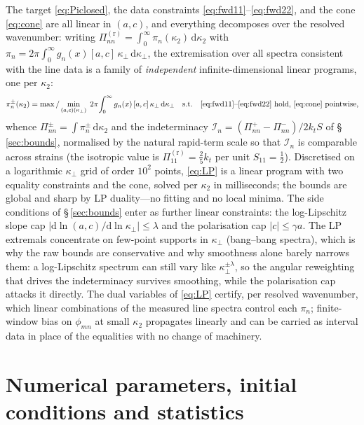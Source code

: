 \documentclass[lineno]{JFM-FLM_Au}
\begin{document}
The target \eqref{eq:Piclosed}, the data constraints
\eqref{eq:fwd11}--\eqref{eq:fwd22}, and the cone \eqref{eq:cone} are all
linear in $(a,c)$, and everything decomposes over the resolved wavenumber:
writing $\Pi^{(\mathrm r)}_{nn}=\int_0^\infty
\pi_n(\kappa_2)\,\mathrm{d}\kappa_2$ with
$\pi_n=2\pi\int_0^\infty g_n(x)[a,c]\,\kappa_\perp\,\mathrm{d}\kappa_\perp$,
the extremisation over all spectra consistent with the line data is a
family of \emph{independent} infinite-dimensional linear programs, one per
$\kappa_2$:
\begin{equation}
  \pi_n^{\pm}(\kappa_2)
  = \max/\min_{(a,c)(\kappa_\perp)}\;
    2\pi\!\int_0^\infty g_n(x)\,[a,c]\,\kappa_\perp\,\mathrm{d}\kappa_\perp
  \quad\text{s.t.}\quad
  \text{\eqref{eq:fwd11}--\eqref{eq:fwd22} hold, \eqref{eq:cone}
  pointwise},
  \label{eq:LP}
\end{equation}
whence $\Pi^{\pm}_{nn}=\int\pi_n^{\pm}\,\mathrm{d}\kappa_2$ and the
indeterminacy $\mathcal I_n=(\Pi^{+}_{nn}-\Pi^{-}_{nn})/2k_tS$ of
\S\,\ref{sec:bounds}, normalised by the natural rapid-term scale so that
$\mathcal I_n$ is comparable across strains (the isotropic value is
$\Pi^{(\mathrm r)}_{11}=\tfrac25 k_t$ per unit $S_{11}=\tfrac12$).
Discretised on a logarithmic $\kappa_\perp$ grid of order $10^2$ points,
\eqref{eq:LP} is a linear program with two equality constraints and the
cone, solved per $\kappa_2$ in milliseconds; the bounds are global and
sharp by LP duality---no fitting and no local minima. The side conditions
of \S\,\ref{sec:bounds} enter as further linear constraints: the
log-Lipschitz slope cap
$|\mathrm{d}\ln(a,c)/\mathrm{d}\ln\kappa_\perp|\le\lambda$ and the
polarisation cap $|c|\le\gamma a$. The LP extremals concentrate on
few-point supports in $\kappa_\perp$ (bang--bang spectra), which is why
the raw bounds are conservative and why smoothness alone barely narrows
them: a log-Lipschitz spectrum can still vary like
$\kappa_\perp^{\pm\lambda}$, so the angular reweighting that drives the
indeterminacy survives smoothing, while the polarisation cap attacks it
directly. The dual variables of \eqref{eq:LP} certify, per resolved
wavenumber, which linear combinations of the measured line spectra control
each $\pi_n$; finite-window bias on $\phi_{mn}$ at small $\kappa_2$
propagates linearly and can be carried as interval data in place of the
equalities with no change of machinery.

\section{Numerical parameters, initial conditions and statistics}
\label{app:numerics}
\end{document}
